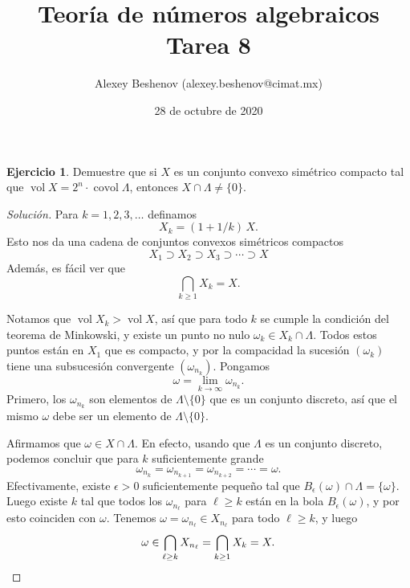 \documentclass{article}
\title{Teoría de números algebraicos\\Tarea 8}
\author{Alexey Beshenov (alexey.beshenov@cimat.mx)}
\date{28 de octubre de 2020}
\newcounter{tarea}
\theoremstyle{definition}
\newtheorem{ejercicio}{Ejercicio}[tarea]
\newenvironment{solucion}{\begin{proof}[Solución]}{\end{proof}}
\DeclareMathOperator{\covol}{covol}
\DeclareMathOperator{\vol}{vol}
\begin{document}
{\sffamily\bfseries\maketitle}

\ifdefined\solutions
\else
\thispagestyle{empty}
\fi

\vspace{1em}

\begin{ejercicio}
  Demuestre que si $X$ es un conjunto convexo simétrico compacto tal que
  $\vol X = 2^n\cdot \covol \Lambda$, entonces $X \cap \Lambda \ne \{ 0 \}$.

  \ifdefined\solutions
  \begin{solucion}
    Para $k = 1,2,3,\ldots$ definamos
    $$X_k = (1 + 1/k)\,X.$$
    Esto nos da una cadena de conjuntos convexos simétricos compactos
    $$X_1 \supset X_2 \supset X_3 \supset \cdots \supset X$$
    Además, es fácil ver que
    $$\bigcap_{k\ge 1} X_k = X.$$

    Notamos que $\vol X_k > \vol X$, así que para todo $k$ se cumple la
    condición del teorema de Minkowski, y existe un punto no nulo
    $\omega_k \in X_k \cap \Lambda$. Todos estos puntos están en $X_1$ que es
    compacto, y por la compacidad la sucesión $(\omega_k)$ tiene una subsucesión
    convergente $(\omega_{n_k})$. Pongamos
    $$\omega = \lim_{k\to\infty} \omega_{n_k}.$$
    Primero, los $\omega_{n_k}$ son elementos de $\Lambda\setminus\{ 0 \}$ que
    es un conjunto discreto, así que el mismo $\omega$ debe ser un elemento de
    $\Lambda\setminus \{ 0 \}$.

    Afirmamos que $\omega \in X \cap \Lambda$. En efecto, usando que $\Lambda$
    es un conjunto discreto, podemos concluir que para $k$ suficientemente
    grande
    $$\omega_{n_k} = \omega_{n_{k+1}} = \omega_{n_{k+2}} = \cdots = \omega.$$
    Efectivamente, existe $\epsilon > 0$ suficientemente pequeño tal que
    $B_\epsilon (\omega) \cap \Lambda = \{ \omega \}$. Luego existe $k$ tal que
    todos los $\omega_{n_\ell}$ para $\ell \ge k$ están en la bola
    $B_\epsilon (\omega)$, y por esto coinciden con $\omega$.
    Tenemos $\omega = \omega_{n_\ell} \in X_{n_\ell}$ para todo $\ell \ge k$, y
    luego
    \[ \omega \in \bigcap_{\ell \ge k} X_{n_\ell} = \bigcap_{k\ge 1} X_k = X. \qedhere \]
  \end{solucion}
  \fi
\end{ejercicio}
\end{document}
